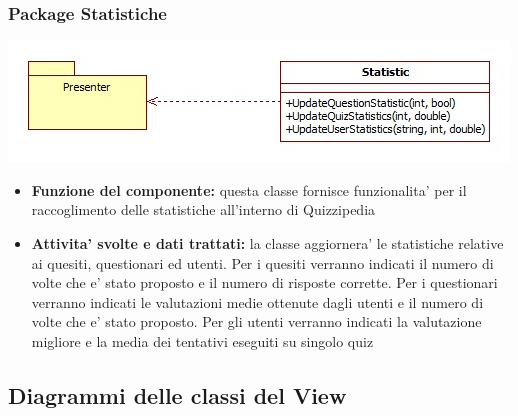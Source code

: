 \documentclass[a4paper,11pt]{article}
\begin{document}
			\subsubsection{Package Statistiche}
			\begin{center}
				\includegraphics[scale=0.6]{../images/Statistics.jpg}
			\end{center}
 			\begin{itemize}
		    	\item\textbf{Funzione del componente:} questa classe fornisce funzionalita' per il raccoglimento delle statistiche all'interno di Quizzipedia
			\item\textbf{Attivita' svolte e dati trattati:} la classe aggiornera' le statistiche relative ai quesiti, questionari ed utenti.
			Per i quesiti verranno indicati il numero di volte che e' stato proposto e il numero di risposte corrette.
			Per i questionari verranno indicati le valutazioni medie ottenute dagli utenti e il numero di volte che e' stato proposto.
			Per gli utenti verranno indicati la valutazione migliore e la media dei tentativi eseguiti su singolo quiz
			\end{itemize}
			
			\subsection{Diagrammi delle classi del View}
\end{document}
